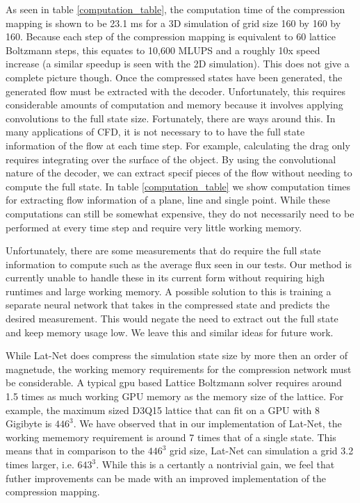 \documentclass{article}
\begin{document}
As seen in table \ref{computation_table}, the computation time of the compression mapping is shown to be 23.1 ms for a 3D simulation of grid size 160 by 160 by 160. Because each step of the compression mapping is equivalent to 60 lattice Boltzmann steps, this equates to 10,600 MLUPS and a roughly 10x speed increase (a similar speedup is seen with the 2D simulation). This does not give a complete picture though. Once the compressed states have been generated, the generated flow must be extracted with the decoder. Unfortunately, this requires considerable amounts of computation and memory because it involves applying convolutions to the full state size. Fortunately, there are ways around this. In many applications of CFD, it is not necessary to to have the full state information of the flow at each time step. For example, calculating the drag only requires integrating over the surface of the object. By using the convolutional nature of the decoder, we can extract specif pieces of the flow without needing to compute the full state. In table \ref{computation_table} we show computation times for extracting flow information of a plane, line and single point. While these computations can still be somewhat expensive, they do not necessarily need to be performed at every time step and require very little working memory. 

Unfortunately, there are some measurements that do require the full state information to compute such as the average flux seen in our tests. Our method is currently unable to handle these in its current form without requiring high runtimes and large working memory. A possible solution to this is training a separate neural network that takes in the compressed state and predicts the desired measurement. This would negate the need to extract out the full state and keep memory usage low. We leave this and similar ideas for future work.

While Lat-Net does compress the simulation state size by more then an order of magnetude, the working memory requirements for the compression network must be considerable. A typical gpu based Lattice Boltzmann solver requires around 1.5 times as much working GPU memory as the memory size of the lattice. For example, the maximum sized D3Q15 lattice that can fit on a GPU with 8 Gigibyte is $446^3$. We have observed that in our implementation of Lat-Net, the working mememory requirement is around 7 times that of a single state. This means that in comparison to the $446^3$ grid size, Lat-Net can simulation a grid 3.2 times larger, i.e. $643^3$. While this is a certantly a nontrivial gain, we feel that futher improvements can be made with an improved implementation of the compression mapping.
\end{document}
